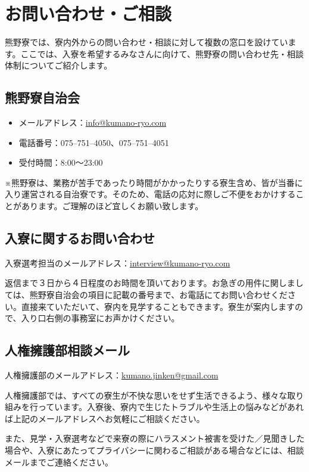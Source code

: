 \section{お問い合わせ・ご相談}\label{sec:otoiawase}
熊野寮では、寮内外からの問い合わせ・相談に対して複数の窓口を設けています。ここでは、入寮を希望するみなさんに向けて、熊野寮の問い合わせ先・相談体制についてご紹介します。

\subsection{熊野寮自治会}
\begin{itemize}
\item メールアドレス：\url{info@kumano-ryo.com}
\item 電話番号：075--751--4050、075--751--4051
\item 受付時間：8:00～23:00
\end{itemize}
\noindent ※熊野寮は、業務が苦手であったり時間がかかったりする寮生含め、皆が当番に入り運営される自治寮です。そのため、電話の応対に際しご不便をおかけすることがあります。ご理解のほど宜しくお願い致します。

\subsection{入寮に関するお問い合わせ}
\noindent 入寮選考担当のメールアドレス：\url{interview@kumano-ryo.com}

返信まで３日から４日程度のお時間を頂いております。お急ぎの用件に関しましては、熊野寮自治会の項目に記載の番号まで、お電話にてお問い合わせください。直接来ていただいて、寮内を見学することもできます。寮生が案内しますので、入り口右側の事務室にお声かけください。 

\subsection{人権擁護部相談メール}
\noindent 人権擁護部のメールアドレス：\url{kumano.jinken@gmail.com}

人権擁護部では、すべての寮生が不快な思いをせず生活できるよう、様々な取り組みを行っています。入寮後、寮内で生じたトラブルや生活上の悩みなどがあれば上記のメールアドレスへお気軽にご相談ください。

また、見学・入寮選考などで来寮の際にハラスメント被害を受けた／見聞きした場合や、入寮にあたってプライバシーに関わるご相談がある場合などには、相談メールまでご連絡ください。

